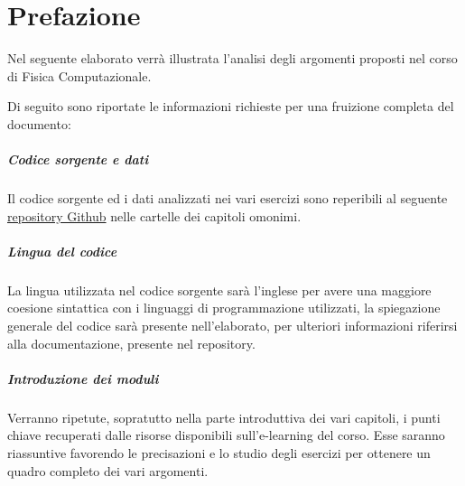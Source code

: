 \chapter*{Prefazione}

Nel seguente elaborato verrà illustrata l’analisi degli argomenti proposti nel
corso di Fisica Computazionale.

Di seguito sono riportate le informazioni richieste per una fruizione completa 
del documento:

	\paragraph{Codice sorgente e dati} Il codice sorgente ed i dati analizzati nei 
        vari esercizi sono reperibili al seguente 
        \href{https://github.com/ARossiUnimib/Fisica-Computazionale}{repository Github} 
        nelle cartelle dei capitoli omonimi.

	\paragraph{Lingua del codice} La lingua utilizzata nel codice sorgente sarà 
        l’inglese per avere una maggiore coesione sintattica con i linguaggi di 
        programmazione utilizzati, la spiegazione generale del codice sarà presente
        nell'elaborato, per ulteriori informazioni riferirsi alla documentazione,
        presente nel repository.

	\paragraph{Introduzione dei moduli} Verranno ripetute, sopratutto nella parte 
        introduttiva dei vari capitoli, i punti chiave recuperati dalle risorse 
        disponibili sull’e-learning del corso. 
        Esse saranno riassuntive favorendo le precisazioni e lo studio
		degli esercizi per ottenere un quadro completo dei vari argomenti.

